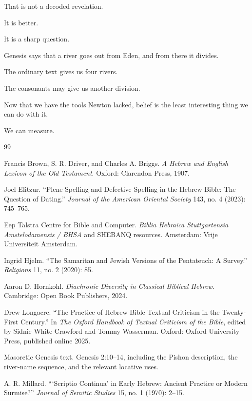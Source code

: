 That is not a decoded revelation.

It is better.

It is a sharp question.

Genesis says that a river goes out from Eden, and from there it divides.

The ordinary text gives us four rivers.

The consonants may give us another division.

Now that we have the tools Newton lacked, belief is the least interesting thing we can do with it.

We can measure.

\begin{thebibliography}{99}

Francis Brown, S. R. Driver, and Charles A. Briggs.
\newblock \textit{A Hebrew and English Lexicon of the Old Testament}.
\newblock Oxford: Clarendon Press, 1907.

Joel Elitzur.
\newblock ``Plene Spelling and Defective Spelling in the Hebrew Bible: The Question of Dating.''
\newblock \textit{Journal of the American Oriental Society} 143, no. 4 (2023): 745--765.

Eep Talstra Centre for Bible and Computer.
\newblock \textit{Biblia Hebraica Stuttgartensia Amstelodamensis / BHSA} and SHEBANQ resources.
\newblock Amsterdam: Vrije Universiteit Amsterdam.

Ingrid Hjelm.
\newblock ``The Samaritan and Jewish Versions of the Pentateuch: A Survey.''
\newblock \textit{Religions} 11, no. 2 (2020): 85.

Aaron D. Hornkohl.
\newblock \textit{Diachronic Diversity in Classical Biblical Hebrew}.
\newblock Cambridge: Open Book Publishers, 2024.

Drew Longacre.
\newblock ``The Practice of Hebrew Bible Textual Criticism in the Twenty-First Century.''
\newblock In \textit{The Oxford Handbook of Textual Criticism of the Bible}, edited by Sidnie White Crawford and Tommy Wasserman.
\newblock Oxford: Oxford University Press, published online 2025.

\newblock Masoretic Genesis text.
\newblock Genesis 2:10--14, including the Pishon description, the river-name sequence, and the relevant locative uses.

A. R. Millard.
\newblock ```Scriptio Continua' in Early Hebrew: Ancient Practice or Modern Surmise?''
\newblock \textit{Journal of Semitic Studies} 15, no. 1 (1970): 2--15.


\end{thebibliography}
